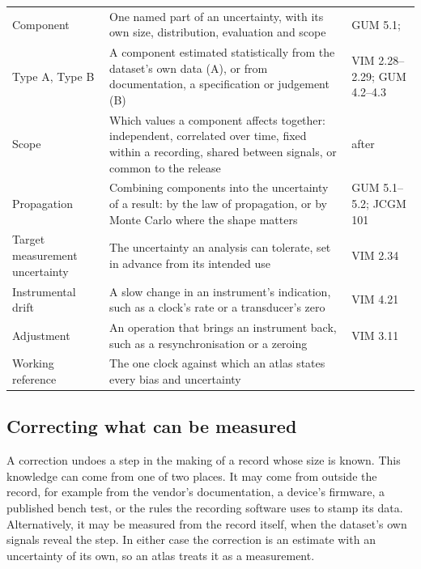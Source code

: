 \documentclass[11pt,a4paper]{article}
\begin{document}
\begin{table}[tp]
\begin{tabularx}{\textwidth}{@{}P{0.2\textwidth}LP{0.2\textwidth}@{}}
  Component & One named part of an uncertainty, with its own size, distribution, evaluation and scope & GUM 5.1;
    \citet{mittaz2019metrology} \\
  Type A, Type B & A component estimated statistically from the dataset's own data (A), or from documentation,
    a specification or judgement (B) & VIM 2.28--2.29; GUM 4.2--4.3 \\
  Scope & Which values a component affects together: independent, correlated over time, fixed within a recording,
    shared between signals, or common to the release & after \citet{mittaz2019metrology} \\
  Propagation & Combining components into the uncertainty of a result: by the law of propagation, or by Monte
    Carlo where the shape matters & GUM 5.1--5.2; JCGM 101 \\
  Target measurement uncertainty & The uncertainty an analysis can tolerate, set in advance from its intended use &
    VIM 2.34 \\
  Instrumental drift & A slow change in an instrument's indication, such as a clock's rate or a transducer's zero
    & VIM 4.21 \\
  Adjustment & An operation that brings an instrument back, such as a resynchronisation or a zeroing & VIM 3.11 \\
  Working reference & The one clock against which an atlas states every bias and uncertainty & \\
  \bottomrule
\end{tabularx}
\end{table}

\subsection{Correcting what can be measured}
\label{sec:correct}

A correction undoes a step in the making of a record whose size is known. This knowledge can come from one of two
places. It may come from outside the record, for example from the vendor's documentation, a device's firmware, a
published bench test, or the rules the recording software uses to stamp its data. Alternatively, it may be measured
from the record itself, when the dataset's own signals reveal the step. In either case the correction is an estimate
with an uncertainty of its own, so an atlas treats it as a measurement.
\end{document}
